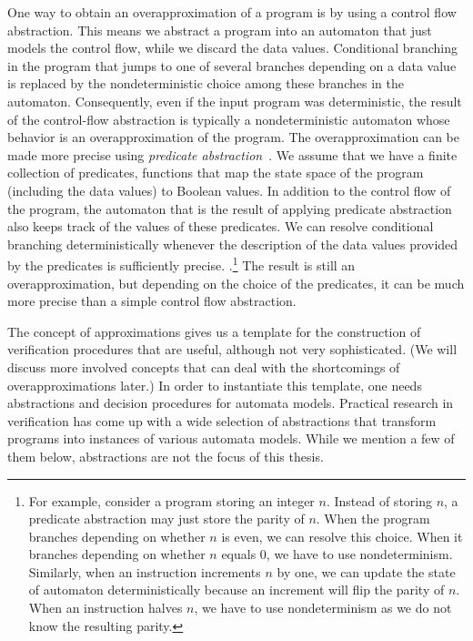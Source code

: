 \documentclass[../../diss.tex]{subfiles}
\begin{document}
One way to obtain an overapproximation of a program is by using a control flow abstraction.
This means we abstract a program into an automaton that just models the control flow, while we discard the data values.
Conditional branching in the program that jumps to one of several branches depending on a data value is replaced by the nondeterministic choice among these branches in the automaton.
Consequently, even if the input program was deterministic, the result of the control-flow abstraction is typically a nondeterministic automaton whose behavior is an overapproximation of the program.
%
The overapproximation can be made more precise using \emph{predicate abstraction}~\cite{GrafS97}.
We assume that we have a finite collection of predicates, functions that map the state space of the program (including the data values) to Boolean values.
In addition to the control flow of the program, the automaton that is the result of applying predicate abstraction also keeps track of the values of these predicates.
We can resolve conditional branching deterministically whenever the description of the data values provided by the predicates is sufficiently precise.
.\footnote{%
    For example, consider a program storing an integer $n$.
    Instead of storing $n$, a predicate abstraction may just store the parity of $n$.
    When the program branches depending on whether $n$ is even, we can resolve this choice.
    When it branches depending on whether $n$ equals $0$, we have to use nondeterminism.
    Similarly, when an instruction increments $n$ by one, we can update the state of automaton deterministically because an increment will flip the parity of $n$.
    When an instruction halves $n$, we have to use nondeterminism as we do not know the resulting parity.
}
The result is still an overapproximation, but depending on the choice of the predicates, it can be much more precise than a simple control flow abstraction.

The concept of approximations gives us a template for the construction of verification procedures that are useful, although not very sophisticated.
(We will discuss more involved concepts that can deal with \eg the shortcomings of overapproximations later.)
In order to instantiate this template, one needs abstractions and decision procedures for automata models.
Practical research in verification has come up with a wide selection of abstractions that transform programs into instances of various automata models.
While we mention a few of them below, abstractions are not the focus of this thesis.
\end{document}
